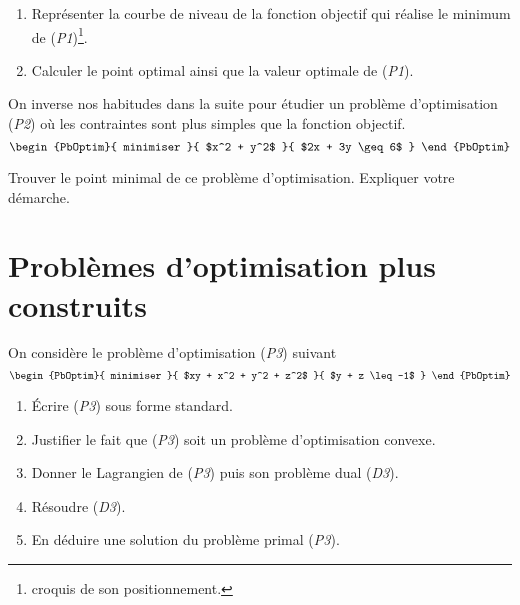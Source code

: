 \documentclass[11pt, a4paper]{article}
\begin{document}
\begin{question}{3}
  \begin{enumerate}
  \item Représenter la courbe de niveau de la fonction objectif qui
    réalise le minimum de (\emph{P1})\footnote{croquis de son
      positionnement.}.
  \item Calculer le point optimal ainsi que la valeur optimale de
    (\emph{P1}).
  \end{enumerate}
\end{question}
On inverse nos habitudes dans la suite pour étudier un problème
d'optimisation (\emph{P2}) où les contraintes sont plus simples que la
fonction objectif.
\[
\begin{PbOptim}{
    minimiser
  }{
    $x^2 + y^2$
  }{
    $2x + 3y \geq 6$
  }
\end{PbOptim}
\]
\begin{question}{3}
  Trouver le point minimal de ce problème d'optimisation. Expliquer
  votre démarche.
\end{question}

\section{Problèmes d'optimisation plus construits}
\label{sec:plusdur}

\noindent On considère le problème d'optimisation (\emph{P3}) suivant
\[
\begin{PbOptim}{
    minimiser
  }{
    $xy + x^2 + y^2 + z^2$
  }{
    $y + z \leq -1$
    }
\end{PbOptim}
\]
\begin{question}{5}
  \begin{enumerate}
  \item Écrire (\emph{P3}) sous forme standard.
  \item Justifier le fait que (\emph{P3}) soit un problème
    d'optimisation convexe.
  \item Donner le Lagrangien de (\emph{P3}) puis son problème dual
    (\emph{D3}).
  \item Résoudre (\emph{D3}).
  \item En déduire une solution du problème primal (\emph{P3}).
  \end{enumerate}
\end{question}
\end{document}
